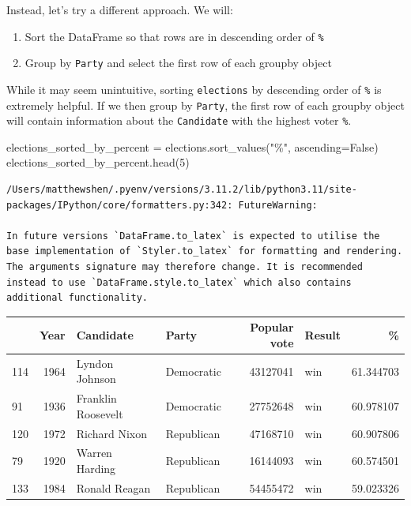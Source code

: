 \documentclass[
  letterpaper,
  DIV=11,
  numbers=noendperiod]{scrreprt}
\newenvironment{Shaded}{\begin{snugshade}}{\end{snugshade}}
\newcommand{\DecValTok}[1]{\textcolor[rgb]{0.68,0.00,0.00}{#1}}
\newcommand{\NormalTok}[1]{\textcolor[rgb]{0.00,0.23,0.31}{#1}}
\newcommand{\OperatorTok}[1]{\textcolor[rgb]{0.37,0.37,0.37}{#1}}
\newcommand{\StringTok}[1]{\textcolor[rgb]{0.13,0.47,0.30}{#1}}
\newcommand{\VariableTok}[1]{\textcolor[rgb]{0.07,0.07,0.07}{#1}}
\providecommand{\tightlist}{%
  \setlength{\itemsep}{0pt}\setlength{\parskip}{0pt}}\usepackage{longtable,booktabs,array}
\begin{document}
Instead, let's try a different approach. We will:

\begin{enumerate}
\def\labelenumi{\arabic{enumi}.}
\tightlist
\item
  Sort the DataFrame so that rows are in descending order of \texttt{\%}
\item
  Group by \texttt{Party} and select the first row of each groupby
  object
\end{enumerate}

While it may seem unintuitive, sorting \texttt{elections} by descending
order of \texttt{\%} is extremely helpful. If we then group by
\texttt{Party}, the first row of each groupby object will contain
information about the \texttt{Candidate} with the highest voter
\texttt{\%}.

\begin{Shaded}
\begin{Highlighting}[]
\NormalTok{elections\_sorted\_by\_percent }\OperatorTok{=}\NormalTok{ elections.sort\_values(}\StringTok{"\%"}\NormalTok{, ascending}\OperatorTok{=}\VariableTok{False}\NormalTok{)}
\NormalTok{elections\_sorted\_by\_percent.head(}\DecValTok{5}\NormalTok{)}
\end{Highlighting}
\end{Shaded}

\begin{verbatim}
/Users/matthewshen/.pyenv/versions/3.11.2/lib/python3.11/site-packages/IPython/core/formatters.py:342: FutureWarning:

In future versions `DataFrame.to_latex` is expected to utilise the base implementation of `Styler.to_latex` for formatting and rendering. The arguments signature may therefore change. It is recommended instead to use `DataFrame.style.to_latex` which also contains additional functionality.
\end{verbatim}

\begin{tabular}{lrllrlr}
\toprule
{} &  Year &           Candidate &       Party &  Popular vote & Result &          \% \\
\midrule
114 &  1964 &      Lyndon Johnson &  Democratic &      43127041 &    win &  61.344703 \\
91  &  1936 &  Franklin Roosevelt &  Democratic &      27752648 &    win &  60.978107 \\
120 &  1972 &       Richard Nixon &  Republican &      47168710 &    win &  60.907806 \\
79  &  1920 &      Warren Harding &  Republican &      16144093 &    win &  60.574501 \\
133 &  1984 &       Ronald Reagan &  Republican &      54455472 &    win &  59.023326 \\
\bottomrule
\end{tabular}
\end{document}
